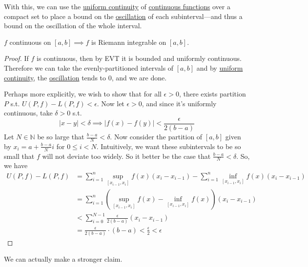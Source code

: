   With this, we can use the \hyperref[def:uniform-continuity]{uniform continuity} of \hyperref[pst-def:continuous_func]{continuous functions} over a compact set to place a bound on the \hyperref[def:oscillation]{oscillation} of each subinterval---and thus a bound on the oscillation of the whole interval. 

  \begin{theorem}
    \label{thm:continuous-riemann}
    $f$ continuous on $[a, b] \implies f$ is Riemann integrable on $[a, b]$. 
  \end{theorem}
  \begin{proof}
    If $f$ is continuous, then by EVT it is bounded and uniformly continuous. Therefore we can take the evenly-partitioned intervals of $[a, b]$ and by \hyperref[def:uniform-continuity]{uniform continuity}, the \hyperref[def:oscillation]{oscillation} tends to $0$, and we are done. 

    Perhaps more explicitly, we wish to show that for all $\epsilon > 0$, there exists partition $P$ s.t. $U(P, f) - L(P, f) < \epsilon$. Now let $\epsilon > 0$, and since it's uniformly continuous, take $\delta > 0$ s.t. 
    \begin{equation}
      |x - y| < \delta \implies |f(x) - f(y)| < \frac{\epsilon}{2(b-a)}
    \end{equation}
    Let $N \in \mathbb{N}$ be so large that $\frac{b-a}{N} < \delta$. Now consider the partition of $[a, b]$ given by $x_i = a + \frac{b-a}{N} i$ for $0 \leq i < N$. Intuitively, we want these subintervals to be so small that $f$ will not deviate too widely. So it better be the case that $\frac{b - a}{N} < \delta$. So, we have
    \begin{align}
      U(P, f) - L(P, f) & = \sum_{i=1}^n \sup_{[x_{i-1}, x_{i}]} f(x) (x_i - x_{i-1}) - \sum_{i=1}^n \inf_{[x_{i-1}, x_{i}]} f(x) (x_i - x_{i-1}) \\ 
                        & = \sum_{i=1}^n (\sup_{[x_{i-1}, x_{i}]} f(x) - \inf_{[x_{i-1}, x_{i}]} f(x) ) (x_i - x_{i-1}) \\ 
                        & < \sum_{i=0}^{N-1} \frac{\epsilon}{2 (b - a)} (x_i - x_{i-1}) \\
                        & = \frac{\epsilon}{2 (b - a)} \cdot (b - a) < \frac{\epsilon}{2} < \epsilon
    \end{align}
  \end{proof}

  We can actually make a stronger claim. 

